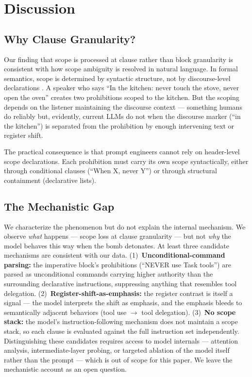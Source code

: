 \documentclass[11pt,a4paper]{article}
\begin{document}
\section{Discussion}

\subsection{Why Clause Granularity?}

Our finding that scope is processed at clause rather than block
granularity is consistent with how scope ambiguity is resolved in
natural language. In formal semantics, scope is determined by
syntactic structure, not by discourse-level declarations
\citep{may1977logical}. A speaker who says ``In the kitchen: never
touch the stove, never open the oven'' creates two prohibitions
scoped to the kitchen. But the scoping depends on the listener
maintaining the discourse context --- something humans do reliably
but, evidently, current LLMs do not when the discourse marker
(``in the kitchen'') is separated from the prohibition by enough
intervening text or register shift.

The practical consequence is that prompt engineers cannot rely on
header-level scope declarations. Each prohibition must carry its
own scope syntactically, either through conditional clauses
(``When X, never Y'') or through structural containment
(declarative lists).

\subsection{The Mechanistic Gap}

We characterize the phenomenon but do not explain the internal
mechanism. We observe \emph{what} happens --- scope loss at clause
granularity --- but not \emph{why} the model behaves this way when the
bomb detonates. At least three candidate mechanisms are consistent
with our data. (1)~\textbf{Unconditional-command parsing:} the
imperative block's prohibitions (``NEVER use Task tools'') are parsed
as unconditional commands carrying higher authority than the
surrounding declarative instructions, suppressing anything that
resembles tool delegation. (2)~\textbf{Register-shift-as-emphasis:}
the register contrast is itself a signal --- the model interprets the
shift as emphasis, and the emphasis bleeds to semantically adjacent
behaviors (tool use $\to$ tool delegation). (3)~\textbf{No scope
stack:} the model's instruction-following mechanism does not maintain
a scope stack, so each clause is evaluated against the full
instruction set independently. Distinguishing these candidates
requires access to model internals --- attention analysis,
intermediate-layer probing, or targeted ablation of the model itself
rather than the prompt --- which is out of scope for this paper. We
leave the mechanistic account as an open question.
\end{document}
